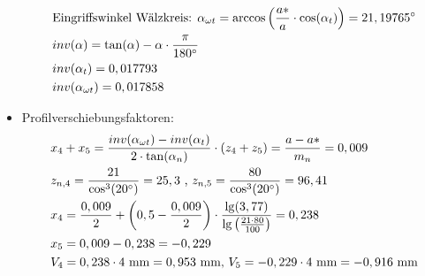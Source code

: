 \begin{itemize}
\begin{align*}
	&\text{Eingriffswinkel Wälzkreis: } \alpha_{\omega t} = \arccos \left( \frac{a*}{a} \cdot \cos(\alpha_t)\right) = 21,19765 ^\circ \\
	&inv(\alpha) = \tan(\alpha) -\alpha \cdot \frac{\pi}{180^\circ} \\
	&inv(\alpha_t) = 0,017793 \\
	&inv(\alpha_{\omega t}) = 0,017858 
\end{align*}
\item Profilverschiebungsfaktoren:
\begin{align*}
	&x_4 + x_5 = \frac{inv(\alpha_{\omega t})-inv(\alpha_{t})}{2 \cdot \tan(\alpha_{n})} \cdot (z_4 + z_5) = \frac{a - a*}{m_n} = 0,009 \\
	&z_{n,4} = \frac{21}{\cos^3(20^\circ)} = 25,3 \text{ , }z_{n,5} = \frac{80}{\cos^3(20^\circ)} = 96,41 \\
	&x_4 =\frac{0,009}{2} + \left( 0,5 - \frac{0,009}{2} \right) \cdot \frac{\lg(3,77)}{\lg\left( \frac{21 \cdot 80}{100} \right)} = 0,238 \\
	&x_5 = 0,009 - 0,238 = - 0,229 \\ 
	&V_4 = 0,238 \cdot 4 \text{ mm} = 0,953 \text{ mm, }V_5 = -0,229\cdot 4 \text{ mm} = -0,916 \text{ mm} 
\end{align*}
\end{itemize}
